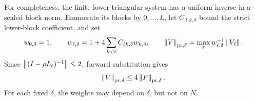 For completeness, the finite lower-triangular system has a uniform inverse
in a scaled block norm.  Enumerate its blocks by \(0,\ldots,L\), let
\(C_{\ell k,\delta}\) bound the strict lower-block coefficient, and set
\begin{equation}
 w_{0,\delta}=1,\qquad
 w_{\ell,\delta}=1+4\sum_{k<\ell}C_{\ell k,\delta}w_{k,\delta},\qquad
 \left\lVert V\right\rVert_{\rm pr,\delta}
 =\max_\ell w_{\ell,\delta}^{-1}\left\lVert V_\ell\right\rVert.
 \label{eq:supp-prolonged-norm}
\end{equation}
Since \(\left\lVert(I-\rho L_\ell)^{-1}\right\rVert\le2\), forward substitution gives
\begin{equation}
 \left\lVert V\right\rVert_{\rm pr,\delta}\le4\left\lVert F\right\rVert_{\rm pr,\delta}.
 \label{eq:supp-prolonged-inverse}
\end{equation}
For each fixed \(\delta\), the weights may depend on \(\delta\), but not on
\(N\).

